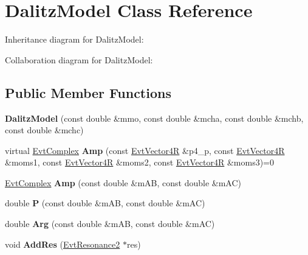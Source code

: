 \hypertarget{class_dalitz_model}{}\section{Dalitz\+Model Class Reference}
\label{class_dalitz_model}


Inheritance diagram for Dalitz\+Model\+:


Collaboration diagram for Dalitz\+Model\+:
\subsection*{Public Member Functions}
\begin{DoxyCompactItemize}
\item 
\hypertarget{class_dalitz_model_a7f60fe1b0e7b25e8f9abf0d818ff814f}{}{\bfseries Dalitz\+Model} (const double \&mmo, const double \&mcha, const double \&mchb, const double \&mchc)\label{class_dalitz_model_a7f60fe1b0e7b25e8f9abf0d818ff814f}

\item 
\hypertarget{class_dalitz_model_aa71202f65a945995dba4a262c4dbad5e}{}virtual \hyperlink{class_evt_complex}{Evt\+Complex} {\bfseries Amp} (const \hyperlink{class_evt_vector4_r}{Evt\+Vector4\+R} \&p4\+\_\+p, const \hyperlink{class_evt_vector4_r}{Evt\+Vector4\+R} \&moms1, const \hyperlink{class_evt_vector4_r}{Evt\+Vector4\+R} \&moms2, const \hyperlink{class_evt_vector4_r}{Evt\+Vector4\+R} \&moms3)=0\label{class_dalitz_model_aa71202f65a945995dba4a262c4dbad5e}

\item 
\hypertarget{class_dalitz_model_a05a5584088b5606fc844b0c194843970}{}\hyperlink{class_evt_complex}{Evt\+Complex} {\bfseries Amp} (const double \&m\+A\+B, const double \&m\+A\+C)\label{class_dalitz_model_a05a5584088b5606fc844b0c194843970}

\item 
\hypertarget{class_dalitz_model_af36884ff619b5d68e8b93f8d8084fb46}{}double {\bfseries P} (const double \&m\+A\+B, const double \&m\+A\+C)\label{class_dalitz_model_af36884ff619b5d68e8b93f8d8084fb46}

\item 
\hypertarget{class_dalitz_model_a7c58dbcfd1901b74addd7643d68ea385}{}double {\bfseries Arg} (const double \&m\+A\+B, const double \&m\+A\+C)\label{class_dalitz_model_a7c58dbcfd1901b74addd7643d68ea385}

\item 
\hypertarget{class_dalitz_model_a25b0efb30599a6076185a794306ce777}{}void {\bfseries Add\+Res} (\hyperlink{class_evt_resonance2}{Evt\+Resonance2} $\ast$res)\label{class_dalitz_model_a25b0efb30599a6076185a794306ce777}


\end{DoxyCompactItemize}

